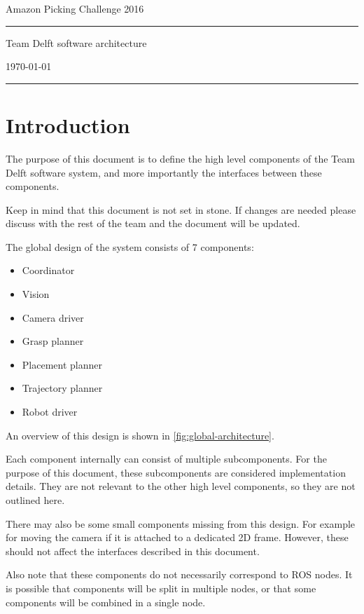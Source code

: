 \documentclass[a4paper]{article}
\begin{document}
\begin{titlepage}
\vspace{10em}
\centering
{\LARGE Amazon Picking Challenge 2016}

\hrule

{\Huge Team Delft software architecture}

\today

\hrule

\tableofcontents

\vfill
\end{titlepage}

\section{Introduction}
The purpose of this document is to define the high level components of the Team Delft software system,
and more importantly the interfaces between these components.

Keep in mind that this document is not set in stone.
If changes are needed please discuss with the rest of the team and the document will be updated.

The global design of the system consists of 7 components:

\begin{itemize}
\item Coordinator
\item Vision
\item Camera driver
\item Grasp planner
\item Placement planner
\item Trajectory planner
\item Robot driver
\end{itemize}

An overview of this design is shown in \autoref{fig:global-architecture}.

Each component internally can consist of multiple subcomponents.
For the purpose of this document, these subcomponents are considered implementation details.
They are not relevant to the other high level components, so they are not outlined here.

There may also be some small components missing from this design.
For example for moving the camera if it is attached to a dedicated 2D frame.
However, these should not affect the interfaces described in this document.

Also note that these components do not necessarily correspond to ROS nodes.
It is possible that components will be split in multiple nodes,
or that some components will be combined in a single node.
\end{document}
